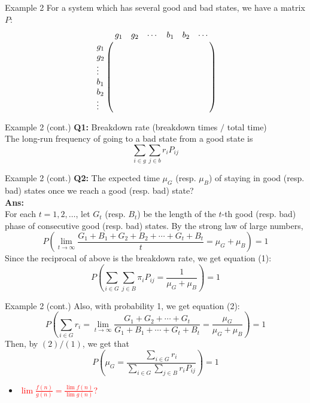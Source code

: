 \documentclass{beamer}
\begin{document}
\begin{frame}{Example 2}
	For a system which has several good and bad states, we have a matrix $P$:
	\[
	\bordermatrix{~      & g_1 & g_2 & \cdots & b_1 & b_2 & \cdots \cr
                  g_1    &     &     &        &     &     &        \cr
                  g_2    &     &     &        &     &     &        \cr
                  \vdots &     &     &        &     &     &        \cr
                  b_1    &     &     &        &     &     &        \cr
                  b_2    &     &     &        &     &     &        \cr
                  \vdots &     &     &        &     &     &        \cr}
	\]
\end{frame}

\begin{frame}{Example 2 (cont.)}
	\textbf{Q1:} Breakdown rate (breakdown times $/$ total time)\\
	The long-run frequency of going to a bad state from a good state is
	\[
	\sum_{i \in g} \sum_{j \in b} r_i P_{ij}
	\]
\end{frame}

\begin{frame}{Example 2 (cont.)}
	\textbf{Q2:} The expected time $\mu_G$ (resp. $\mu_B$) of staying in good (resp. bad) states once we reach a good (resp. bad) state? \\
	\textbf{Ans:} \\
	For each $t = 1, 2, \ldots$, let $G_t$ (resp. $B_t$) be the length of the $t$-th good (resp. bad) phase of consecutive good (resp. bad) states.
	By the strong law of large numbers, 
	\[
	P\left( \lim_{t\to\infty} \frac{G_1 + B_1 + G_2 + B_2 + \cdots + G_t + B_t}{t} = \mu_G + \mu_B \right) = 1
	\]
	Since the reciprocal of above is the breakdown rate, we get equation (1):
	\[
	P\left( \sum_{i \in G} \sum_{j \in B} \pi_i P_{ij} = \frac{1}{\mu_G + \mu_B} \right) = 1
	\]
\end{frame}

\begin{frame}{Example 2 (cont.)}
	Also, with probability 1, we get equation (2):
	\[
	P\left( \sum_{i \in G} r_i = 
	\lim_{t\to\infty}\frac{G_1 + G_2 + \cdots + G_t}{G_1 + B_1 + \cdots + G_t + B_t}
	= \frac{\mu_G}{\mu_G + \mu_B} \right) = 1
	\]
	Then, by $(2)/(1)$, we get that
	\[
	P\left( \mu_G = \frac{\sum_{i \in G} r_i}{\sum_{i \in G}\sum_{j \in B} r_i P_{ij}} \right) = 1
	\]
	\begin{itemize}
	\item \textcolor{red}{$\lim \frac{f(n)}{g(n)} = \frac{\lim f(n)}{\lim g(n)}$?}
	\end{itemize}
\end{frame}
\end{document}
